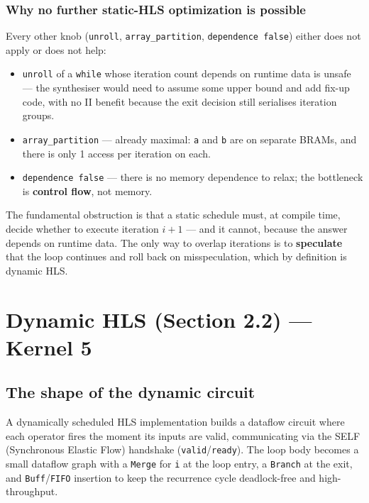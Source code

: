 \documentclass[11pt,a4paper]{article}
\begin{document}
\subsubsection*{Why no further static-HLS optimization is possible}

Every other knob (\texttt{unroll}, \texttt{array\_partition}, \texttt{dependence false}) either does not apply or does not help:

\begin{itemize}
  \item \texttt{unroll} of a \texttt{while} whose iteration count depends on runtime data is unsafe --- the synthesiser would need to assume some upper bound and add fix-up code, with no II benefit because the exit decision still serialises iteration groups.
  \item \texttt{array\_partition} --- already maximal: \texttt{a} and \texttt{b} are on separate BRAMs, and there is only 1 access per iteration on each.
  \item \texttt{dependence false} --- there is no memory dependence to relax; the bottleneck is \textbf{control flow}, not memory.
\end{itemize}

The fundamental obstruction is that a static schedule must, at compile time, decide whether to execute iteration $i+1$ --- and it cannot, because the answer depends on runtime data. The only way to overlap iterations is to \textbf{speculate} that the loop continues and roll back on misspeculation, which by definition is dynamic HLS.

\section{Dynamic HLS (Section 2.2) --- Kernel 5}\label{sec:dynamic}

\subsection*{The shape of the dynamic circuit}

A dynamically scheduled HLS implementation builds a dataflow circuit where each operator fires the moment its inputs are valid, communicating via the SELF (Synchronous Elastic Flow) handshake (\texttt{valid}/\texttt{ready}). The loop body becomes a small dataflow graph with a \texttt{Merge} for \texttt{i} at the loop entry, a \texttt{Branch} at the exit, and \texttt{Buff}/\texttt{FIFO} insertion to keep the recurrence cycle deadlock-free and high-throughput.
\end{document}
